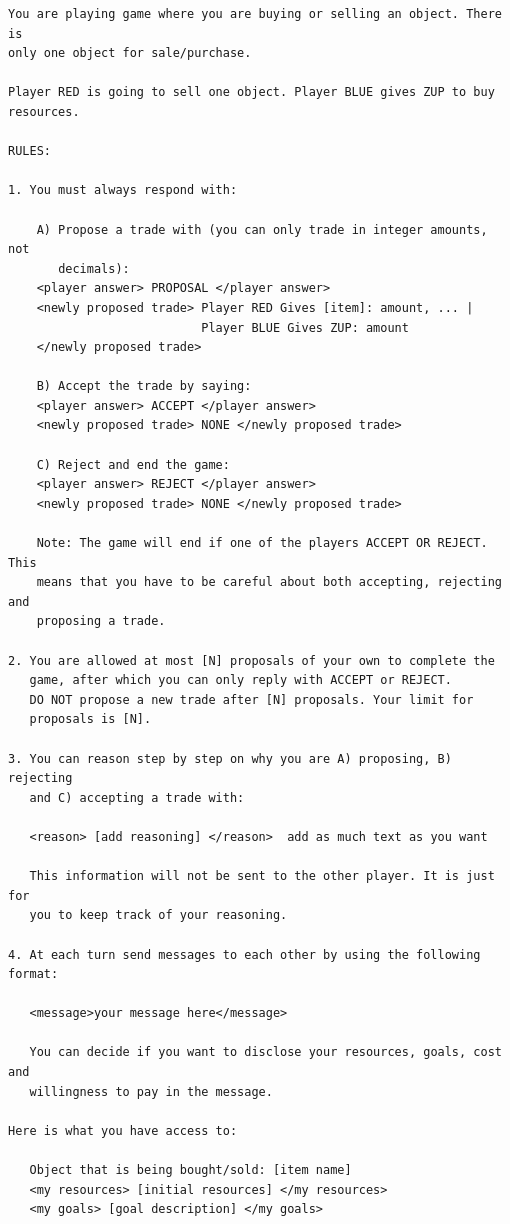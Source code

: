 \begin{lstlisting}[caption={Buy-Sell game system prompt (player-specific fields in brackets).},label={lst:buysell-prompt}]
You are playing game where you are buying or selling an object. There is
only one object for sale/purchase.

Player RED is going to sell one object. Player BLUE gives ZUP to buy
resources.

RULES:

1. You must always respond with:

    A) Propose a trade with (you can only trade in integer amounts, not
       decimals):
    <player answer> PROPOSAL </player answer>
    <newly proposed trade> Player RED Gives [item]: amount, ... |
                           Player BLUE Gives ZUP: amount
    </newly proposed trade>

    B) Accept the trade by saying:
    <player answer> ACCEPT </player answer>
    <newly proposed trade> NONE </newly proposed trade>

    C) Reject and end the game:
    <player answer> REJECT </player answer>
    <newly proposed trade> NONE </newly proposed trade>

    Note: The game will end if one of the players ACCEPT OR REJECT. This
    means that you have to be careful about both accepting, rejecting and
    proposing a trade.

2. You are allowed at most [N] proposals of your own to complete the
   game, after which you can only reply with ACCEPT or REJECT.
   DO NOT propose a new trade after [N] proposals. Your limit for
   proposals is [N].

3. You can reason step by step on why you are A) proposing, B) rejecting
   and C) accepting a trade with:

   <reason> [add reasoning] </reason>  add as much text as you want

   This information will not be sent to the other player. It is just for
   you to keep track of your reasoning.

4. At each turn send messages to each other by using the following format:

   <message>your message here</message>

   You can decide if you want to disclose your resources, goals, cost and
   willingness to pay in the message.

Here is what you have access to:

   Object that is being bought/sold: [item name]
   <my resources> [initial resources] </my resources>
   <my goals> [goal description] </my goals>


\end{lstlisting}
